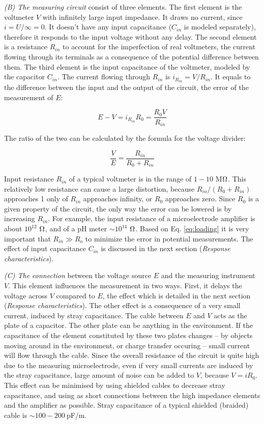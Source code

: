 \emph{(B) The measuring circuit} consist of three elements.
The first element is the voltmeter $V$ with infinitely large input impedance. It draws no current, since $i = U/\infty=0$. It doesn't have any input capacitance ($C_{in}$ is modeled separately), therefore it responds to the input voltage without any delay.
The second element is a resistance $R_{in}$ to account for the imperfection of real voltmeters, the current flowing through its terminals as a consequence of the potential difference between them.
The third element is the input capacitance of the voltmeter, modeled by the capacitor $C_{in}$.
The current flowing through $R_{in}$ is $i_{R_{in}}=V/R_{in}$. It equals to the difference between the input and the output of the circuit, the error of the measurement of $E$:

\begin{equation}
\label{eq:loading}
	E - V = i_{R_{in}} R_0 = \frac{R_0 V}{R_{in}}
\end{equation}

The ratio of the two can be calculated by the formula for the voltage divider: 

\begin{equation}
\label{eq:loading2}
        \frac{V}{E} = \frac{R_{in}}{R_0+R_{in}}
\end{equation}

Input resistance $R_{in}$ of a typical voltmeter is in the range of $1-10$ M$\ohm$.
This relatively low resistance can cause a large distortion, because $R_{in}/(R_0+R_{in})$ approaches 1 only of $R_{in}$ approaches infinity, or $R_0$ approaches zero.
Since $R_0$ is a given property of the circuit, the only way the error can be lowered is by increasing $R_{in}$.
For example, the input resistance of a microelectrode amplifier is about $10^{12}$ $\ohm$, and of a pH meter $\sim 10^{14}$ $\ohm$.
Based on Eq. \ref{eq:loading} it is very important that $R_{in} \gg R_o$ to minimize the error in potential measurements.
The effect of input capacitance $C_{in}$ is discussed in the next section (\emph{Response characteristics}).

\emph{(C) The connection} between the voltage source $E$ and the measuring instrument $V$.
This element influences the measurement in two ways.
First, it delays the voltage across $V$ compared to $E$, the effect which is detailed in the next section (\emph{Response characteristics}).
The other effect is a consequence of a very small current, induced by stray capacitance.
The cable between $E$ and $V$ acts as the plate of a capacitor.
The other plate can be anything in the environment.
If the capacitance of the element constituted by these two plates changes -- by objects moving around in the environment, or charge transfer occuring -- small current will flow through the cable.
Since the overall resistance of the circuit is quite high due to the measuring microelectrode, even if very small currents are induced by the stray capacitance, large amount of noise can be added to $V$, because $V = iR_0$.
This effect can be minimised by using shielded cables to decrease stray capacitance, and using as short connections between the high impedance elements and the amplifier as possible.
Stray capacitance of a typical shielded (braided) cable is $\sim 100-200~$pF/m.

